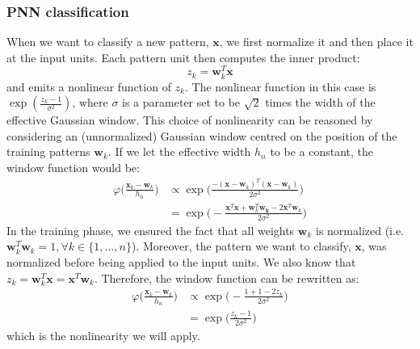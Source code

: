 	\subsubsection*{PNN classification}
	When we want to classify a new pattern, $\mathbf{x}$, we first normalize it and then place it at the input units. Each pattern unit then computes the inner product:
	\begin{equation}
		z_k = \mathbf{w}_k^T \mathbf{x}
		\label{Eq: impl/ml/pnn/innerprod}
	\end{equation}   
	and emits a nonlinear function of $z_k$. The nonlinear function in this case is $\exp(\frac{z_k-1}{\sigma^2})$, where $\sigma$ is a parameter set to be $\sqrt{2}$ times the width of the effective Gaussian window. This choice of nonlinearity can be reasoned by considering an (unnormalized) Gaussian window centred on the position of the training patterns $\mathbf{w}_k$. If we let the effective width $h_n$ to be a constant, the window function would be:
	\begin{equation}
		\begin{split}
			\varphi\bigg(\frac{\mathbf{x}_k - \mathbf{w}_k}{h_n}\bigg) & \propto \exp\bigg(\frac{
				-(\mathbf{x}-\mathbf{w}_k)^T(\mathbf{x}-\mathbf{w}_k)
			}{
				2\sigma^2
			}\bigg) \\
		 & = \exp\bigg(
			 -
			 \frac{
				 \mathbf{x}^T\mathbf{x} + \mathbf{w}_k^T\mathbf{w_k} - 2\mathbf{x}^T\mathbf{w}_k 	
			 }{
				 2\sigma^2
			 }
		 \bigg)
		\end{split}
	\end{equation}
	In the training phase, we ensured the fact that all weights $\mathbf{w}_k$ is normalized (i.e. $\mathbf{w}_k^T\mathbf{w}_k = 1, \forall k \in \{1,\dots,n\}$). Moreover, the pattern we want to classify, $\mathbf{x}$, was normalized before being applied to the input units. We also know that $z_k = \mathbf{w}_k^T\mathbf{x} = \mathbf{x}^T\mathbf{w}_k$. Therefore, the window function can be rewritten as: 
	\begin{equation}
		\begin{split}
			\varphi\bigg(\frac{\mathbf{x}_k - \mathbf{w}_k}{h_n}\bigg) & \propto
				\exp\bigg(
					-
					\frac{
						1 + 1 - 2z_k
					}{
						2\sigma^2
					}
				\bigg) \\
				& = \exp \bigg(
					\frac{
						z_k - 1
					}{
						2\sigma^2
					}
				\bigg)
		\end{split}
	\end{equation}
	which is the nonlinearity we will apply. 
	\\ \\
